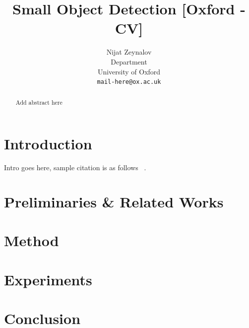 \documentclass{article}
\title{Small Object Detection [Oxford - CV]}
\author{%
  Nijat Zeynalov \\
  Department\\
  University of Oxford\\
  \texttt{mail-here@ox.ac.uk} \\  
}
\begin{document}
\maketitle


\begin{abstract}
    Add abstract here
\end{abstract}


\section{Introduction}

Intro goes here, sample citation is as follows ~\cite{tian2025yolov12}.

\section{Preliminaries \& Related Works}


\section{Method}


\section{Experiments}


\section{Conclusion}



\end{document}

